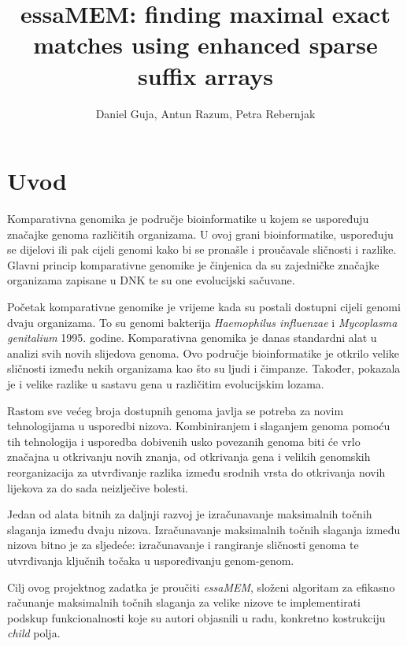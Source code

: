 \documentclass[times, utf8, seminar, numeric]{fer}
\begin{document}
\title{essaMEM: finding maximal exact matches using enhanced sparse suffix arrays}
\author{Daniel Guja, Antun Razum, Petra Rebernjak}

\maketitle
\tableofcontents

\chapter{Uvod}

Komparativna genomika je područje bioinformatike u kojem se uspoređuju značajke genoma različitih organizama. U ovoj grani bioinformatike, uspoređuju se dijelovi ili pak cijeli genomi kako bi se pronašle i proučavale sličnosti i razlike. Glavni princip komparativne genomike je činjenica da su zajedničke značajke organizama zapisane u DNK te su one evolucijski sačuvane.

Početak komparativne genomike je vrijeme kada su postali dostupni cijeli genomi dvaju organizama. To su genomi bakterija \textit{Haemophilus influenzae} i \textit{Mycoplasma genitalium} 1995. godine. Komparativna genomika je danas standardni alat u analizi svih novih slijedova genoma. Ovo područje bioinformatike je otkrilo velike sličnosti između nekih organizama kao što su ljudi i čimpanze. Također, pokazala je i velike razlike u sastavu gena u različitim evolucijskim lozama.

Rastom sve većeg broja dostupnih genoma javlja se potreba za novim tehnologijama u usporedbi nizova. Kombiniranjem i slaganjem genoma pomoću tih tehnologija i usporedba dobivenih usko povezanih genoma biti će vrlo značajna u otkrivanju novih znanja, od otkrivanja gena i velikih genomskih reorganizacija za utvrđivanje razlika između srodnih vrsta do otkrivanja novih lijekova za do sada neizlječive bolesti.

Jedan od alata bitnih za daljnji razvoj je izračunavanje maksimalnih točnih slaganja između dvaju nizova. Izračunavanje maksimalnih točnih slaganja između nizova bitno je za sljedeće: izračunavanje i rangiranje sličnosti genoma te utvrđivanja ključnih točaka u uspoređivanju genom-genom.

Cilj ovog projektnog zadatka je proučiti \textit{essaMEM}\cite{essa}, složeni algoritam za efikasno računanje maksimalnih točnih slaganja za velike nizove te implementirati podskup funkcionalnosti koje su autori objasnili u radu, konkretno kostrukciju \textit{child} polja.
\end{document}
